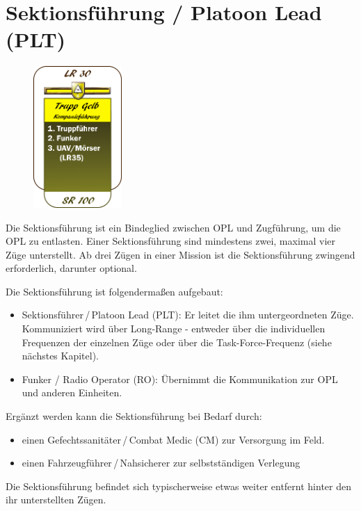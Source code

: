 \section{Sektionsführung / Platoon Lead (PLT)}
\begin{figure}
	\vspace{-20pt}
	\centering 
	\includegraphics[width=0.3\textwidth]{../img/truppenordnung/sektionsfuehrung/sektionsfuehrung}
	\vspace{-5pt}
\end{figure}	
Die Sektionsführung ist ein Bindeglied zwischen OPL und Zugführung, um die OPL zu entlasten. Einer Sektionsführung sind mindestens zwei, maximal vier Züge unterstellt. Ab drei Zügen in einer Mission ist die Sektionsführung zwingend erforderlich, darunter optional.
\par\medskip
Die Sektionsführung ist folgendermaßen aufgebaut:
\begin{itemize}
	\item Sektionsführer\,/\,Platoon Lead (PLT): Er leitet die ihm untergeordneten Züge. Kommuniziert wird über Long-Range - entweder über die individuellen Frequenzen der einzelnen Züge oder über die Task-Force-Frequenz (siehe nächstes Kapitel).
	\item Funker / Radio Operator (RO): Übernimmt die Kommunikation zur OPL und anderen Einheiten.
\end{itemize}
Ergänzt werden kann die Sektionsführung bei Bedarf durch:
\begin{itemize}
	\setlength\itemsep{0em}
	\item einen Gefechtssanitäter\,/\,Combat Medic (CM) zur Versorgung im Feld.
	\item einen Fahrzeugführer\,/\,Nahsicherer zur selbstständigen Verlegung
\end{itemize} 
Die Sektionsführung befindet sich typischerweise etwas weiter entfernt hinter den ihr unterstellten Zügen.
